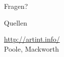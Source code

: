 \documentclass[10pt]{beamer}
\begin{document}
\begin{frame}[standout]
    Fragen?
\end{frame}

\appendix

\begin{frame}[allowframebreaks]{Quellen}

    
    
    \url{http://artint.info/}\\
    Poole, Mackworth

\end{frame}
\end{document}
